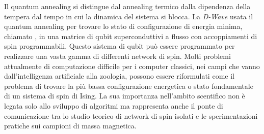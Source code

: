 Il quantum annealing si distingue dal annealing termico dalla dipendenza della tempera dal tempo in cui la dinamica del sistema si blocca. La \textit{D-Wave} usata il quantum annealing per trovare lo stato di configurazione di energia minima, chiamato , in una matrice di qubit superconduttivi a flusso con accoppiamenti di spin programmabili. Questo sistema di qubit può essere programmato per realizzare una vasta gamma di differenti network di spin. Molti problemi attualmente di computazione difficile per i computer classici, nei campi che vanno dall'intelligenza artificiale alla zoologia, possono essere riformulati come il problema di trovare la più bassa configurazione energetica o stato fondamentale di un sistema di spin di Ising. La sua importanza nell'ambito scentifico non è legata solo allo sviluppo di algoritmi ma rappresenta anche il ponte di comunicazione tra lo studio teorico di network di spin isolati e le sperimentazioni pratiche sui campioni di massa magnetica.

